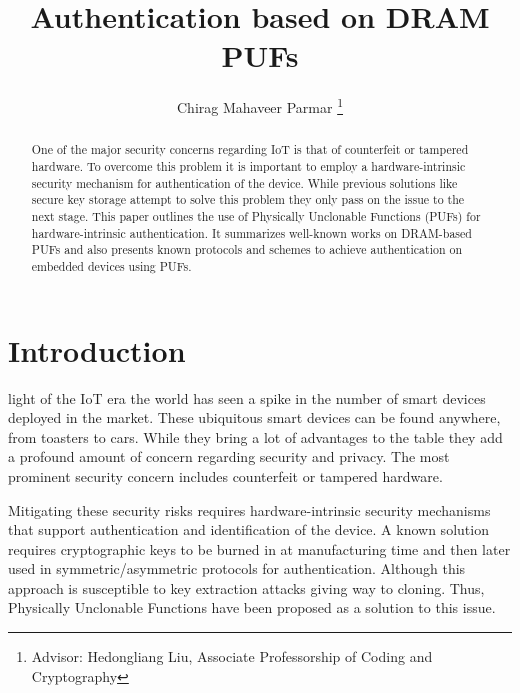 \documentclass[journal, a4paper]{IEEEtran}
\begin{document}
\title{Authentication based on DRAM PUFs}
\author{Chirag Mahaveer Parmar
\thanks{Advisor: Hedongliang Liu, Associate Professorship of Coding and Cryptography}}
\maketitle

\begin{abstract}
One of the major security concerns regarding IoT is that of counterfeit or tampered hardware. To overcome this problem it is important to employ a hardware-intrinsic security mechanism for authentication of the device. While previous solutions like secure key storage attempt to solve this problem they only pass on the issue to the next stage. This paper outlines the use of Physically Unclonable Functions (PUFs) for hardware-intrinsic authentication. It summarizes well-known works on DRAM-based PUFs and also presents known protocols and schemes to achieve authentication on embedded devices using PUFs.
\end{abstract}

\section{Introduction}
 light of the IoT era the world has seen a spike in the number of smart devices deployed in the market. These ubiquitous smart devices can be found anywhere, from toasters to cars. While they bring a lot of advantages to the table they add a profound amount of concern regarding security and privacy. \cite{EMVT12} The most prominent security concern includes counterfeit or tampered hardware. \cite{PEC06} 

Mitigating these security risks requires hardware-intrinsic security mechanisms that support authentication and identification of the device. A known solution requires cryptographic keys to be burned in at manufacturing time and then later used in symmetric/asymmetric protocols for authentication. Although this approach is susceptible to key extraction attacks giving way to cloning. Thus, Physically Unclonable Functions have been proposed as a solution to this issue.
\end{document}
